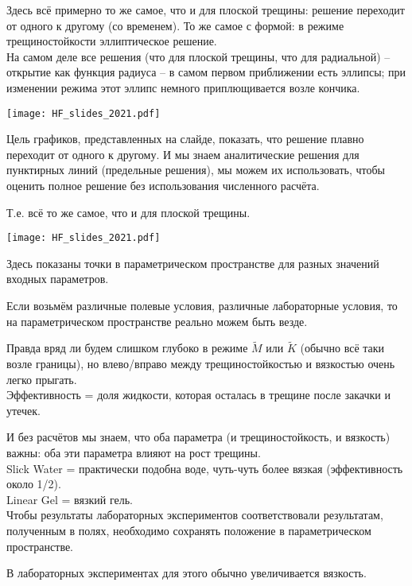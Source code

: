 \documentclass[main.tex]{subfiles}
\begin{document}
Здесь всё примерно то же самое, что и для плоской трещины: решение переходит от одного к другому (со временем).
То же самое с формой: в режиме трещиностойкости эллиптическое решение.
\\

На самом деле все решения (что для плоской трещины, что для радиальной) -- открытие как функция радиуса -- в самом первом приближении есть эллипсы; при изменении режима этот эллипс немного приплющивается возле кончика.

\texttt{[image: HF\_slides\_2021.pdf]}

Цель графиков, представленных на слайде, показать, что решение плавно переходит от одного к другому.
И мы знаем аналитические решения для пунктирных линий (предельные решения), мы можем их использовать, чтобы оценить полное решение без использования численного расчёта.

Т.е. всё то же самое, что и для плоской трещины.

\texttt{[image: HF\_slides\_2021.pdf]}

Здесь показаны точки в параметрическом пространстве для разных значений входных параметров.

Если возьмём различные полевые условия, различные лабораторные условия, то на параметрическом пространстве реально можем быть везде.

Правда вряд ли будем слишком глубоко в режиме $\tilde{M}$ или $\tilde{K}$ (обычно всё таки возле границы), но влево/вправо между трещиностойкостью и вязкостью очень легко прыгать.
\\

Эффективность = доля жидкости, которая осталась в трещине после закачки и утечек.

И без расчётов мы знаем, что оба параметра (и трещиностойкость, и вязкость) важны: оба эти параметра влияют на рост трещины.
\\

Slick Water = практически подобна воде, чуть-чуть более вязкая (эффективность около 1/2).
\\

Linear Gel = вязкий гель.
\\

Чтобы результаты лабораторных экспериментов соответствовали результатам, полученным в полях, необходимо сохранять положение в параметрическом пространстве.

В лабораторных экспериментах для этого обычно увеличивается вязкость.
\\
\end{document}
